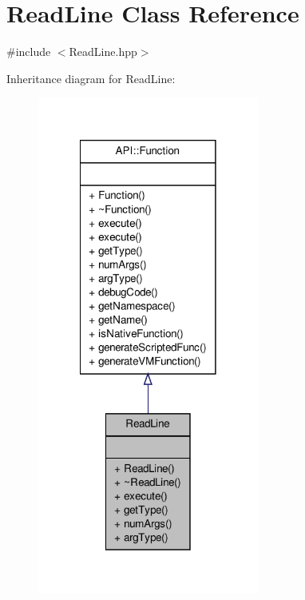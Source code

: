 \hypertarget{class_read_line}{\section{Read\-Line Class Reference}
\label{class_read_line}
}


{\ttfamily \#include $<$Read\-Line.\-hpp$>$}



Inheritance diagram for Read\-Line\-:
\nopagebreak
\begin{figure}[H]
\begin{center}
\leavevmode
\includegraphics[width=206pt]{class_read_line__inherit__graph}
\end{center}
\end{figure}


